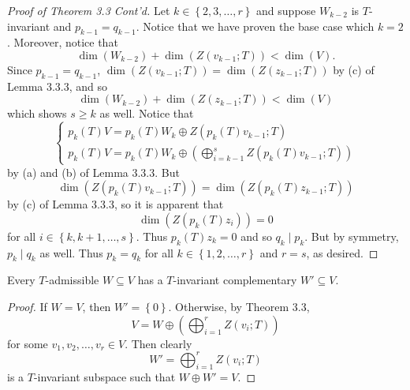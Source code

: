 \documentclass[linearalgebraII]{subfiles}
\begin{document}
    \begin{proof}[Proof of Theorem 3.3 Cont'd]
        Let $k\in \left\lbrace 2,3,\ldots,r \right\rbrace$ and suppose $W_{k-2}$ is $T$-invariant and $p_{k-1} = q_{k-1}$. Notice that we have proven the base case which $k=2$. Moreover, notice that
        \begin{equation*}
            \dim\left( W_{k-2} \right) + \dim\left( Z\left( v_{k-1};T \right)  \right) < \dim(V).
        \end{equation*}
        Since $p_{k-1} = q_{k-1}$, $\dim\left( Z\left(v_{k-1};T\right) \right) = \dim\left( Z\left( z_{k-1};T \right)  \right)$ by (c) of Lemma 3.3.3, and so
        \begin{equation*}
            \dim\left( W_{k-2} \right) + \dim\left( Z\left( z_{k-1};T \right)  \right) < \dim(V)
        \end{equation*}
        which shows $s\geq k$ as well. Notice that
        \begin{equation*}
            \begin{cases} 
                p_k(T)V = p_k(T)W_k \oplus Z\left( p_k(T)v_{k-1};T \right)  \\ 
                p_k(T)V = p_k(T)W_k \oplus \left(\bigoplus^{s}_{i=k-1} Z\left( p_k(T)v_{k-1};T \right)\right) 
            \end{cases}
        \end{equation*}
        by (a) and (b) of Lemma 3.3.3. But
        \begin{equation*}
            \dim\left( Z\left( p_k(T)v_{k-1};T \right)  \right) = \dim\left( Z\left( p_k(T)z_{k-1};T \right) \right) 
        \end{equation*}
        by (c) of Lemma 3.3.3, so it is apparent that
        \begin{equation*}
            \dim\left( Z\left( p_k(T)z_i \right)  \right) = 0
        \end{equation*}
        for all $i\in \left\lbrace k, k+1, \ldots, s \right\rbrace$. Thus $p_k(T)z_k = 0$ and so $q_k\mid p_k$. But by symmetry, $p_k\mid q_k$ as well. Thus $p_k = q_k$ for all $k\in \left\lbrace 1,2,\ldots,r \right\rbrace$ and $r=s$, as desired.
    \end{proof}

    \begin{cor}{}
        Every $T$-admissible $W\subseteq V$ has a $T$-invariant complementary $W'\subseteq V$.
    \end{cor}	

    \begin{proof}
        If $W=V$, then $W'=\left\lbrace 0 \right\rbrace$. Otherwise, by Theorem 3.3,
        \begin{equation*}
            V = W\oplus \left( \bigoplus^{r}_{i=1} Z\left( v_i;T \right)  \right) 
        \end{equation*}
        for some $v_1,v_2,\ldots,v_r\in V$. Then clearly
        \begin{equation*}
            W' = \bigoplus^{r}_{i=1} Z(v_i;T)
        \end{equation*}
        is a $T$-invariant subspace such that $W\oplus W' = V$.
    \end{proof}
\end{document}
